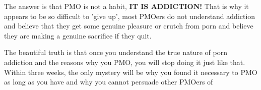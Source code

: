 The answer is that PMO is not a habit, \textbf{IT IS ADDICTION!} That is why it appears to be so difficult to 'give up', most PMOers do not understand addiction and believe that they get some genuine pleasure or crutch from porn and believe they are making a genuine sacrifice if they quit.

The beautiful truth is that once you understand the true nature of porn addiction and the reasons why you PMO, you will stop doing it just like that. Within three weeks, the only mystery will be why you found it necessary to PMO as long as you have and why you cannot persuade other PMOers of 
